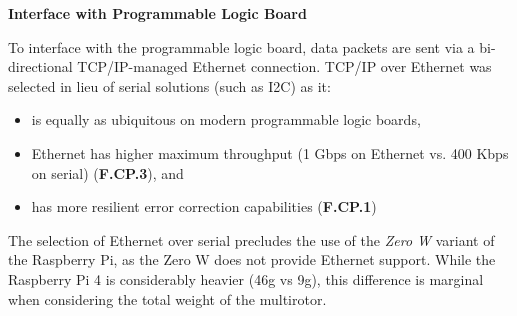 \textbf{Interface with Programmable Logic Board}

To interface with the programmable logic board, data packets are sent via a bi-directional TCP/IP-managed Ethernet connection. TCP/IP over Ethernet was selected in lieu of serial solutions (such as I2C) as it:
\begin{itemize}
\item is equally as ubiquitous on modern programmable logic boards,
\item Ethernet has higher maximum throughput (1 Gbps on Ethernet vs. 400 Kbps on serial) (\textbf{F.CP.3}), and
\item has more resilient error correction capabilities (\textbf{F.CP.1})
\end{itemize} 

The selection of Ethernet over serial precludes the use of the \textit{Zero W} variant of the Raspberry Pi, as the Zero W does not provide Ethernet support. While the Raspberry Pi 4 is considerably heavier (46g vs 9g), this difference is marginal when considering the total weight of the multirotor.

